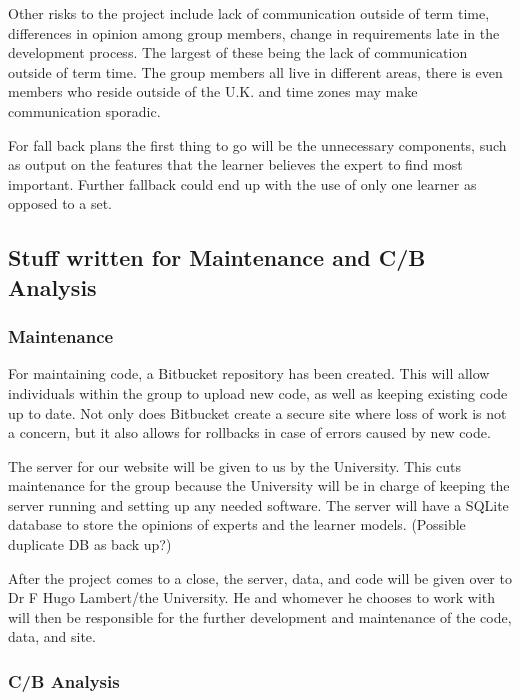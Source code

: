 \documentclass{ecmm427_assignment}
\begin{document}
\quad Other risks to the project include lack of communication outside of term time, differences in opinion among group members, change in requirements late in the development process. The largest of these being the lack of communication outside of term time. The group members all live in different areas, there is even members who reside outside of the U.K. and time zones may make communication sporadic. \par

\quad For fall back plans the first thing to go will be the unnecessary components, such as output on the features that the learner believes the expert to find most important. Further fallback could end up with the use of only one learner as opposed to a set.\par

\subsection{Stuff written for Maintenance and C/B Analysis}

\subsubsection{Maintenance}
\quad For maintaining code, a Bitbucket repository has been created. This will allow individuals within the group to upload new code, as well as keeping existing code up to date.  Not only does Bitbucket create a secure site where loss of work is not a concern, but it also allows for rollbacks in case of errors caused by new code.\par

\quad The server for our website will be given to us by the University. This cuts maintenance for the group because the University will be in charge of keeping the server running and setting up any needed software. The server will have a SQLite database to store the opinions of experts and the learner models. (Possible duplicate DB as back up?)\par

\quad After the project comes to a close, the server, data, and code will be given over to Dr F Hugo Lambert/the University. He and whomever he chooses to work with will then be responsible for the further development and maintenance of the code, data, and site.\par


\subsubsection{C/B Analysis}
\end{document}

